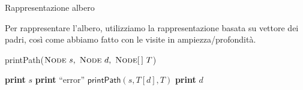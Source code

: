 \begin{frame}{Rappresentazione albero}

Per rappresentare l'albero, utilizziamo la rappresentazione basata su vettore dei padri,
così come abbiamo fatto con le visite in ampiezza/profondità.

\bigskip
\begin{Procedure}
\caption[A]{\textsf{printPath}($\Node\ s,\ \Node\ d,\ \Node[\,]\ T$)}

{
  \textbf{print} $s$
}
\uElseIf{$\parent[d] == \Nil$}
{
  \textbf{print} “error”\;
}
\Else
{
  $\textsf{printPath}(s, T[d], T)$\;
  \textbf{print} $d$
}
\end{Procedure}

\end{frame}



